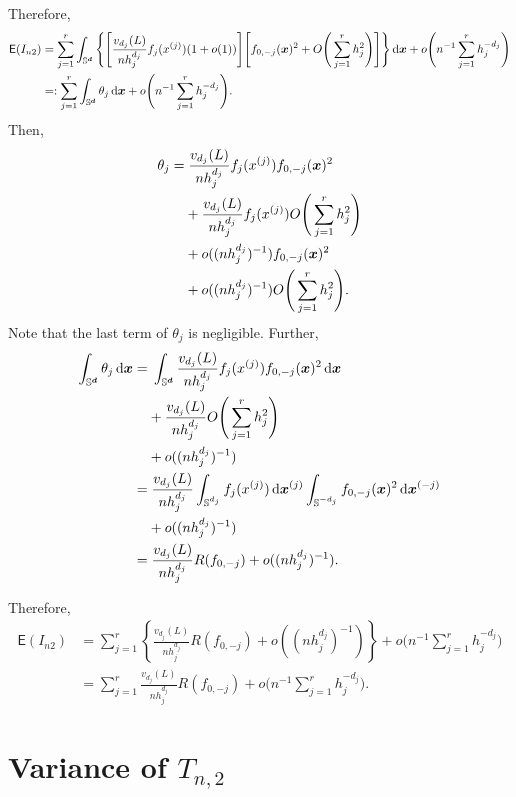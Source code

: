 \documentclass{article}
\begin{document}
Therefore,
\begin{align*}
    \mathsf{E} (I_{n2}) &= \sum_{j=1}^{r} \int_{\mathbb{S}^{\boldsymbol{d}}} \Bigg\{ \Bigg[ \frac{v_{d_j}(L)}{n h_j^{d_j}} f_j(x^{(j)})(1 + o(1)) \Bigg] \Bigg[ f_{0,-j}(\boldsymbol{x})^2+ O \Bigg( \sum_{j=1}^{r} h_j^2 \Bigg) \Bigg] \Bigg\} \,\mathrm{d} \boldsymbol{x} + o \Bigg( n^{-1} \sum_{j=1}^{r} h_j^{-d_j} \Bigg)\\
    &=: \sum_{j=1}^{r} \int_{\mathbb{S}^{\boldsymbol{d}}} \theta_j \,\mathrm{d} \boldsymbol{x} + o \Bigg( n^{-1} \sum_{j=1}^{r} h_j^{-d_j} \Bigg).
\end{align*}
Then,
\begin{align*}
    \theta_j =&\; \frac{v_{d_j}(L)}{n h_j^{d_j}} f_j(x^{(j)}) f_{0,-j}(\boldsymbol{x})^2\\
    &+ \frac{v_{d_j}(L)}{n h_j^{d_j}} f_j(x^{(j)}) O \Bigg( \sum_{j=1}^{r} h_j^2 \Bigg) \\
    &+ o((n h_j^{d_j})^{-1}) f_{0,-j}(\boldsymbol{x})^2\\
    &+ o((n h_j^{d_j})^{-1}) O \Bigg( \sum_{j=1}^{r} h_j^2 \Bigg).
\end{align*}
Note that the last term of $\theta_j$ is negligible. Further,
\begin{align*}
    \int_{\mathbb{S}^{\boldsymbol{d}}} \theta_j \,\mathrm{d} \boldsymbol{x} =&\; \int_{\mathbb{S}^{\boldsymbol{d}}} \frac{v_{d_j}(L)}{n h_j^{d_j}} f_j(x^{(j)}) f_{0,-j}(\boldsymbol{x})^2 \,\mathrm{d} \boldsymbol{x} \\
    &+ \frac{v_{d_j}(L)}{n h_j^{d_j}} O \Bigg( \sum_{j=1}^{r} h_j^2 \Bigg) \\
    &+ o((n h_j^{d_j})^{-1})\\
    =&\; \frac{v_{d_j}(L)}{n h_j^{d_j}} \int_{\mathbb{S}^{d_j}} f_j(x^{(j)})\,\mathrm{d} \boldsymbol{x}^{(j)}  \int_{\mathbb{S}^{-d_j}} f_{0,-j}(\boldsymbol{x})^2 \,\mathrm{d} \boldsymbol{x}^{(-j)} \\
    &+ o((n h_j^{d_j})^{-1})\\
    =&\; \frac{v_{d_j}(L)}{n h_j^{d_j}}  R(f_{0,-j})+ o((n h_j^{d_j})^{-1}).
\end{align*}

Therefore,
\begin{align*}
    \mathsf{E} (I_{n2}) &= \sum_{j=1}^{r} \left\{\frac{v_{d_j}(L)}{n h_j^{d_j}}  R(f_{0,-j})+ o((n h_j^{d_j})^{-1})\right\}+ o \Bigg( n^{-1} \sum_{j=1}^{r} h_j^{-d_j} \Bigg)\\
    &=\sum_{j=1}^{r} \frac{v_{d_j}(L)}{n h_j^{d_j}}  R(f_{0,-j})+ o \Bigg( n^{-1} \sum_{j=1}^{r} h_j^{-d_j} \Bigg).
\end{align*}

\section{Variance of $T_{n,2}$}
\end{document}
